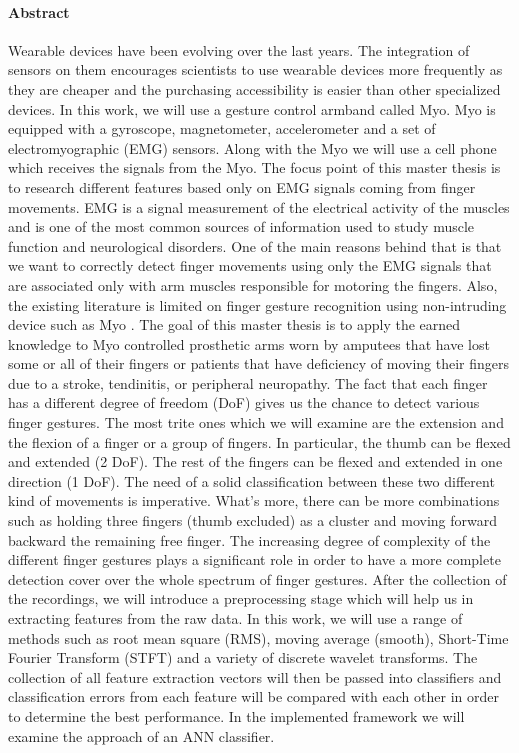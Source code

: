 \cleardoublepage
\vspace {2cm}
\begin{center}
\paragraph{Abstract}
\hrulefill
\end{center}
Wearable devices have been evolving over the last years. The integration of sensors on them encourages scientists to use wearable devices more frequently as they are cheaper and the purchasing accessibility is easier than other specialized devices. In this work, we will use a gesture control armband called Myo. Myo is equipped with a gyroscope, magnetometer, accelerometer and a set of electromyographic (EMG) sensors. Along with the Myo we will use a cell phone which receives the signals from the Myo. The focus point of this master thesis is to research different features based only on EMG signals coming from finger movements. EMG is a signal measurement of the electrical activity of the muscles and is one of the most common sources of information used to study muscle function and neurological disorders. One of the main reasons behind that is that we want to correctly detect finger movements using only the EMG signals that are associated only with arm muscles responsible for motoring the fingers. Also, the existing literature is limited on finger gesture recognition using non-intruding device such as Myo \cite{myo}. The goal of this master thesis is to apply the earned knowledge to Myo controlled prosthetic arms worn by amputees that have lost some or all of their fingers or patients that have deficiency of moving their fingers due to a stroke, tendinitis, or peripheral neuropathy. The fact that each finger has a different degree of freedom (DoF) gives us the chance to detect various finger gestures. The most trite ones which we will examine are the extension and the flexion of a finger or a group of fingers. In particular, the thumb can be flexed and extended (2 DoF). The rest of the fingers can be flexed and extended in one direction (1 DoF). The need of a solid classification between these two different kind of movements is imperative. What’s more, there can be more combinations such as holding three fingers (thumb excluded) as a cluster and moving forward backward the remaining free finger. The increasing degree of complexity of the different finger gestures plays a significant role in order to have a more complete detection cover over the whole spectrum of finger gestures. After the collection of the recordings, we will introduce a preprocessing stage which will help us in extracting features from the raw data. In this work, we will use a range of methods such as root mean square (RMS), moving average (smooth), Short-Time Fourier Transform (STFT) and a variety of discrete wavelet transforms. The collection of all feature extraction vectors will then be passed into classifiers and classification errors from each feature will be compared with each other in order to determine the best performance. In the implemented framework we will examine the approach of an \ac{ANN} classifier.
